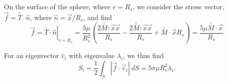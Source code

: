 On the surface of the sphere, where $r=R_s$, we consider the stress vector, $\vec{f} = \bar{\bar{T}}\cdot \hat{n}$, where $\hat{n} = \vec{x}/R_s$, and find
\[
\vec{f} = \left.  \bar{\bar{T}} \cdot \hat{n} \right|_{r=R_s}  = \frac{5 \mu}{R_s^2} \left( \frac{2 \bar{\bar{M}}: \vec{x} \vec{x}}{R_s} -  \frac{2 \bar{\bar{M}}: \vec{x} \vec{x}}{R_s} + \bar{\bar{M}} \cdot \vec{x} R_s  \right) = \frac{5 \mu \bar{\bar{M}} \cdot \vec{x}}{R_s}
\]

For an eigenvector $\hat{v}_i$ with eigenvalue $\lambda_i$, we thus find
\[
S_i  = \frac{1}{2} \int_S | \vec{f} \cdot \vec{v}_i | \ dS = 5  \pi \mu R_s^2 \lambda_i .
\]

